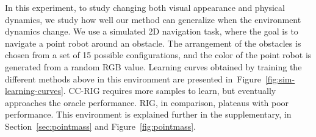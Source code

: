 In this experiment, to study changing both visual appearance and physical dynamics, we study how well our method can generalize when the environment dynamics change. We use a simulated 2D navigation task, where the goal is to navigate a point robot around an obstacle. The arrangement of the obstacles is chosen from a set of 15 possible configurations, and the color of the point robot is generated from a random RGB value. Learning curves obtained by training the different methods above in this environment are presented in~Figure~\ref{fig:sim-learning-curves}.
CC-RIG requires more samples to learn, but eventually approaches the oracle performance. RIG, in comparison, plateaus with poor performance. This environment is explained further in the supplementary, in Section~\ref{sec:pointmass} and Figure~\ref{fig:pointmass}.

